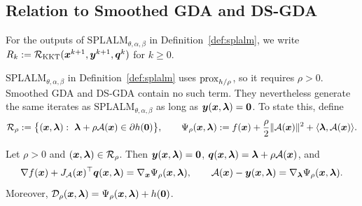 
\subsection{Relation to Smoothed GDA and DS-GDA}
\label{subsec:gda-embedding}

For the
outputs of \(\mathrm{SPLALM}_{\theta,\alpha,\beta}\) in
Definition~\ref{def:splalm}, we write
\(R_k:=\mathcal R_{\mathrm{KKT}}(\bm{x}^{k+1},\bm{y}^{k+1},\bm{q}^k)\) for
\(k\ge0\).

\(\mathrm{SPLALM}_{\theta,\alpha,\beta}\) in Definition~\ref{def:splalm} uses
\(\mathrm{prox}_{h/\rho}\), so it requires \(\rho>0\).
Smoothed GDA and DS-GDA contain no such term. They nevertheless generate the
same iterates as \(\mathrm{SPLALM}_{\theta,\alpha,\beta}\) as long as
\(\bm{y}(\bm{x},\bm{\lambda})=\bm{0}\). To state this, define
\[
\mathcal R_\rho:=\bigl\{(\bm{x},\bm{\lambda}):\ \bm{\lambda}+\rho\mathcal{A}(\bm{x})\in\partial h(\bm{0})\bigr\},
\qquad
\Psi_\rho(\bm{x},\bm{\lambda}):=f(\bm{x})+\frac{\rho}{2}\|\mathcal{A}(\bm{x})\|^2+\langle\bm{\lambda},\mathcal{A}(\bm{x})\rangle .
\]

\begin{proposition}
\label{prop:reduction}
Let \(\rho>0\) and \((\bm{x},\bm{\lambda})\in\mathcal R_\rho\). Then
\(\bm{y}(\bm{x},\bm{\lambda})=\bm{0}\), \(\bm{q}(\bm{x},\bm{\lambda})=\bm{\lambda}+\rho\mathcal{A}(\bm{x})\), and
\[
\nabla f(\bm{x})+J_{\mathcal{A}}(\bm{x})^\top\bm{q}(\bm{x},\bm{\lambda})=\nabla_{\bm{x}}\Psi_\rho(\bm{x},\bm{\lambda}),
\qquad
\mathcal{A}(\bm{x})-\bm{y}(\bm{x},\bm{\lambda})=\nabla_{\bm{\lambda}}\Psi_\rho(\bm{x},\bm{\lambda}).
\]
Moreover,
\(\mathcal{D}_\rho(\bm{x},\bm{\lambda})=\Psi_\rho(\bm{x},\bm{\lambda})+h(\bm{0})\).
\end{proposition}

